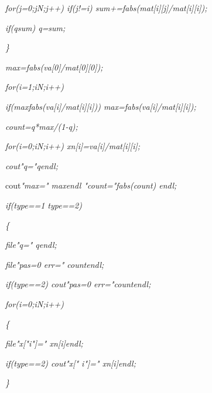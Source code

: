 \documentclass[a4paper,twoside]{book}
\begin{document}
\textit{\qquad \qquad for(j=0;j\TEXTsymbol{<}N;j++) if(j!=i)
sum+=fabs(mat[i][j]/mat[i][i]);}

\textit{\qquad \qquad if(q\TEXTsymbol{<}sum) q=sum;}

\textit{\qquad \}}

\textit{\qquad max=fabs(va[0]/mat[0][0]);}

\textit{\qquad for(i=1;i\TEXTsymbol{<}N;i++) }

\qquad \qquad \textit{if(max\TEXTsymbol{<}fabs(va[i]/mat[i][i]))
max=fabs(va[i]/mat[i][i]);}

\textit{\qquad count=q*max/(1-q);}

\textit{\qquad for(i=0;i\TEXTsymbol{<}N;i++) xn[i]=va[i]/mat[i][i];}

\textit{\qquad cout\TEXTsymbol{<}\TEXTsymbol{<}"q="\TEXTsymbol{<}\TEXTsymbol{%
<}q\TEXTsymbol{<}\TEXTsymbol{<}endl;}

\qquad cout\textit{\TEXTsymbol{<}\TEXTsymbol{<}"max="\TEXTsymbol{<}%
\TEXTsymbol{<}max\TEXTsymbol{<}\TEXTsymbol{<}endl\TEXTsymbol{<}\TEXTsymbol{<}%
"count="\TEXTsymbol{<}\TEXTsymbol{<}fabs(count)\TEXTsymbol{<}\TEXTsymbol{<}%
endl;}

\textit{\qquad if(type==1 \TEXTsymbol{\vert}\TEXTsymbol{\vert} type==2)}

\textit{\qquad \{}

\textit{\qquad \qquad file\TEXTsymbol{<}\TEXTsymbol{<}"q="\TEXTsymbol{<}%
\TEXTsymbol{<}q\TEXTsymbol{<}\TEXTsymbol{<}endl;}

\textit{\qquad \qquad file\TEXTsymbol{<}\TEXTsymbol{<}"pas=0 err="%
\TEXTsymbol{<}\TEXTsymbol{<}count\TEXTsymbol{<}\TEXTsymbol{<}endl;}

\textit{\qquad \qquad if(type==2) cout\TEXTsymbol{<}\TEXTsymbol{<}"pas=0
err="\TEXTsymbol{<}\TEXTsymbol{<}count\TEXTsymbol{<}\TEXTsymbol{<}endl;}

\textit{\qquad \qquad for(i=0;i\TEXTsymbol{<}N;i++)}

\textit{\qquad \qquad \{}

\textit{\qquad \qquad \qquad file\TEXTsymbol{<}\TEXTsymbol{<}"x["\TEXTsymbol{%
<}\TEXTsymbol{<}i\TEXTsymbol{<}\TEXTsymbol{<}"]="\TEXTsymbol{<}\TEXTsymbol{<}%
xn[i]\TEXTsymbol{<}\TEXTsymbol{<}endl;}

\textit{\qquad \qquad \qquad if(type==2) cout\TEXTsymbol{<}\TEXTsymbol{<}"x["%
\TEXTsymbol{<}\TEXTsymbol{<}i\TEXTsymbol{<}\TEXTsymbol{<}"]="\TEXTsymbol{<}%
\TEXTsymbol{<}xn[i]\TEXTsymbol{<}\TEXTsymbol{<}endl;}

\textit{\qquad \qquad \}}
\end{document}
